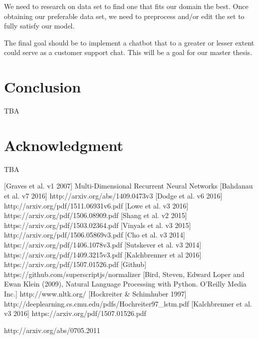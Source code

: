 \documentclass{article} %
\begin{document}
We need to research on data set to find one that fits our domain the best. Once obtaining our preferable data set, we need to preprocess and/or edit the set to fully satisfy our model.

The final goal should be to implement a chatbot that to a greater or lesser extent could serve as a customer support chat. This will be a goal for our master thesis.

\section{Conclusion}
TBA
\section{Acknowledgment}
TBA
\begin{thebibliography}{1}
[Graves et al. v1 2007] Multi-Dimensional Recurrent Neural Networks
[Bahdanau et al. v7 2016] http://arxiv.org/abs/1409.0473v3
[Dodge et al. v6 2016] http://arxiv.org/pdf/1511.06931v6.pdf
[Lowe et al. v3 2016] https://arxiv.org/pdf/1506.08909.pdf
[Shang et al. v2 2015] https://arxiv.org/pdf/1503.02364.pdf
[Vinyals et al. v3 2015] http://arxiv.org/pdf/1506.05869v3.pdf
[Cho et al. v3 2014] https://arxiv.org/pdf/1406.1078v3.pdf
[Sutskever et al. v3 2014] https://arxiv.org/pdf/1409.3215v3.pdf
[Kalchbrenner et al 2016] https://arxiv.org/pdf/1507.01526.pdf
[Github] https://github.com/superscriptjs/normalizer
[Bird, Steven, Edward Loper and Ewan Klein (2009), Natural Language Processing with Python. O’Reilly Media Inc.] http://www.nltk.org/
[Hockreiter \& Schimhuber 1997] http://deeplearning.cs.cmu.edu/pdfs/Hochreiter97\_lstm.pdf
[Kalchbrenner et al. v3 2016] https://arxiv.org/pdf/1507.01526.pdf

\end{thebibliography} http://arxiv.org/abs/0705.2011
\end{document}
